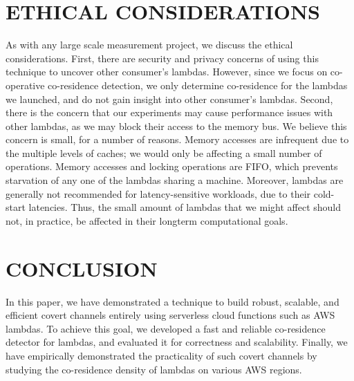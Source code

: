 
\section{ETHICAL CONSIDERATIONS}
As with any large scale measurement project, we discuss the ethical
considerations. First, there are security and privacy concerns of using this
technique to uncover other consumer's lambdas. However, since we focus on
co-operative co-residence detection, we only determine co-residence for the
lambdas we launched, and do not gain insight into other consumer's lambdas.
Second, there is the concern that our experiments may cause performance issues with
other lambdas, as we may block their access to the memory bus. We believe this
concern is small, for a number of reasons. Memory accesses are infrequent due to
the multiple levels of caches; we would only be affecting a small number of
operations. Memory accesses and locking operations are FIFO, which prevents
starvation of any one of the lambdas sharing a machine. Moreover, lambdas are
generally not recommended for latency-sensitive workloads, due to their
cold-start latencies. Thus, the small amount of lambdas that we might affect
should not, in practice, be affected in their longterm computational goals. 


\section{CONCLUSION}
\label{sec:conclusion}
In this paper, we have demonstrated a technique to build robust, scalable, and 
efficient covert channels entirely using serverless cloud functions such as 
AWS lambdas. To achieve this goal, we developed a fast and reliable co-residence 
detector for lambdas, and evaluated it for correctness and scalability.
Finally, we have empirically demonstrated the practicality of such covert 
channels by studying the co-residence density of lambdas on various AWS regions. 


